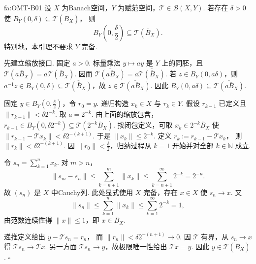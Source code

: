 \begin{FALemma}[B][开映射定量球包含引理]{fa:OMT-B01}
设 \(\displaystyle X\) 为Banach空间，\(\displaystyle Y\) 为赋范空间，\(\displaystyle \mathcal T\in\mathcal B(X,Y)\). 若存在 \(\displaystyle \delta>0\) 使
\(\displaystyle B_Y(0,\delta)\subseteq\overline{\mathcal T(\overline B_X)}\)，
则
\[
B_Y(0,\frac{\delta}{2})\subseteq\mathcal T(\overline B_X).
\]
特别地，本引理不要求 \(\displaystyle Y\) 完备.
\end{FALemma}

\begin{FAProof}
先建立缩放接口. 固定 \(\displaystyle a>0\). 标量乘法 \(\displaystyle y\mapsto ay\) 是 \(\displaystyle Y\) 上的同胚，且 \(\displaystyle \mathcal T(a\overline B_X)=a\mathcal T(\overline B_X)\). 因而
\(\displaystyle \overline{\mathcal T(a\overline B_X)} =a\overline{\mathcal T(\overline B_X)}\).
若 \(\displaystyle z\in B_Y(0,a\delta)\)，则 \(\displaystyle a^{-1}z\in B_Y(0,\delta)\subseteq\overline{\mathcal T(\overline B_X)}\)，故 \(\displaystyle z\in\overline{\mathcal T(a\overline B_X)}\). 因此
\(\displaystyle B_Y(0,a\delta)\subseteq\overline{\mathcal T(a\overline B_X)}\).

固定 \(\displaystyle y\in B_Y(0,\frac{\delta}{2})\)，令 \(\displaystyle r_0=y\). 递归构造 \(\displaystyle x_k\in X\) 与 \(\displaystyle r_k\in Y\). 假设 \(\displaystyle r_{k-1}\) 已定义且 \(\displaystyle \|r_{k-1}\|<\delta2^{-k}\). 取 \(\displaystyle a=2^{-k}\). 由上面的缩放包含，
\(\displaystyle r_{k-1}\in B_Y(0,\delta2^{-k}) \subseteq\overline{\mathcal T(2^{-k}\overline B_X)}\).
按闭包定义，可取 \(\displaystyle x_k\in2^{-k}\overline B_X\) 使
\(\displaystyle \|r_{k-1}-\mathcal T x_k\|<\delta2^{-(k+1)}\).
于是 \(\displaystyle \|x_k\|\leqslant2^{-k}\). 定义
\(\displaystyle r_k:=r_{k-1}-\mathcal T x_k\)，
则 \(\displaystyle \|r_k\|<\delta2^{-(k+1)}\). 因 \(\displaystyle \|r_0\|<\frac{\delta}{2}\)，归纳过程从 \(\displaystyle k=1\) 开始并对全部 \(\displaystyle k\in\mathbb N\) 成立.

令 \(\displaystyle s_n=\sum_{k=1}^n x_k\). 对 \(\displaystyle m>n\)，
\[
\|s_m-s_n\|
\leqslant\sum_{k=n+1}^{m}\|x_k\|
\leqslant\sum_{k=n+1}^{\infty}2^{-k}
=2^{-n}.
\]
故 \(\displaystyle (s_n)\) 是 \(\displaystyle X\) 中Cauchy列. 此处显式使用 \(\displaystyle X\) 完备，存在 \(\displaystyle x\in X\) 使 \(\displaystyle s_n\to x\). 又
\[
\|s_n\|
\leqslant\sum_{k=1}^{n}\|x_k\|
\leqslant\sum_{k=1}^{\infty}2^{-k}
=1,
\]
由范数连续性得 \(\displaystyle \|x\|\leqslant1\)，即 \(\displaystyle x\in\overline B_X\).

递推定义给出
\(\displaystyle y-\mathcal T s_n =r_n\)，
而 \(\displaystyle \|r_n\|<\delta2^{-(n+1)}\to0\). 因 \(\displaystyle \mathcal T\) 有界，从 \(\displaystyle s_n\to x\) 得 \(\displaystyle \mathcal T s_n\to\mathcal T x\). 另一方面 \(\displaystyle \mathcal T s_n\to y\)，故极限唯一性给出 \(\displaystyle \mathcal T x=y\). 因此 \(\displaystyle y\in\mathcal T(\overline B_X)\).
\hfill\(\square\)
\end{FAProof}

